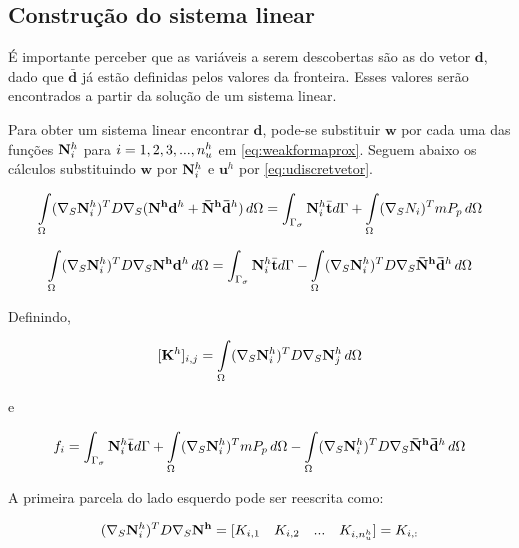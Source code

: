 \subsection{Construção do sistema linear}

É importante perceber que as variáveis a serem descobertas são as do vetor $\mathbf{d}$, dado que $\mathbf{\bar{d}}$ já estão definidas pelos valores da fronteira. Esses valores serão encontrados a partir da solução de um sistema linear.

Para obter um sistema linear encontrar $\mathbf{d}$, pode-se substituir $\mathbf{w}$ por cada uma das funções ${\mathbf{N}_{i}^h}$ para $i = 1, 2, 3, ..., n_u^h$ em \eqref{eq:weakformaprox}. Seguem abaixo os cálculos substituindo $\mathbf{w}$ por ${\mathbf{N}_{i}^h}$ e $\mathbf{u}^h$ por \eqref{eq:udiscretvetor}.


\begin{equation}
\int\limits_{\Omega}  (\nabla_S {\mathbf{N}_{i}^h})^T D \nabla_S (\mathbf{N^h} \mathbf{d}^h + \mathbf{\bar{N}^h} \mathbf{\bar{d}}^h ) \, d\Omega = \int_{\Gamma_\sigma} {\mathbf{N}_{i}^h} \bar{\mathbf{t}}  d\Gamma + \int\limits_{\Omega} (\nabla_S N_i)^T m P_p \, d\Omega
\end{equation}

\begin{equation}\label{eq:umaequacaosistema}
\int\limits_{\Omega}  (\nabla_S {\mathbf{N}_{i}^h})^T D \nabla_S \mathbf{N^h} \mathbf{d}^h  \, d\Omega  = \int_{\Gamma_\sigma} {\mathbf{N}_{i}^h} \bar{\mathbf{t}}  d\Gamma - \int\limits_{\Omega}  (\nabla_S {\mathbf{N}_{i}^h})^T D \nabla_S  \mathbf{\bar{N}^h} \mathbf{\bar{d}}^h \, d\Omega
\end{equation}

Definindo,

\begin{equation}\label{eq:entradamatriz}
    [\mathbf{K}^h]_{i,j} = \int\limits_{\Omega} (\nabla_S {\mathbf{N}_{i}^h})^T D \nabla_S {\mathbf{N}_{j}^h} \, d\Omega 
\end{equation}

e

\begin{equation}\label{eq:entradald}
    f_i = \int_{\Gamma_\sigma} {\mathbf{N}_{i}^h} \bar{\mathbf{t}}  d\Gamma + \int\limits_{\Omega} (\nabla_S {\mathbf{N}_{i}^h})^T m P_p \, d\Omega - \int\limits_{\Omega}  (\nabla_S {\mathbf{N}_{i}^h})^T D \nabla_S  \mathbf{\bar{N}^h} \mathbf{\bar{d}}^h \, d\Omega
\end{equation}



A primeira parcela do lado esquerdo pode ser reescrita como:

\begin{equation}
     (\nabla_S {\mathbf{N}_{i}^h})^T D \nabla_S \mathbf{N^h} = [K_{i,1}\quad  K_{i,2} \quad ... \quad K_{i,n_u^h}] = K_{i,:}
\end{equation}

